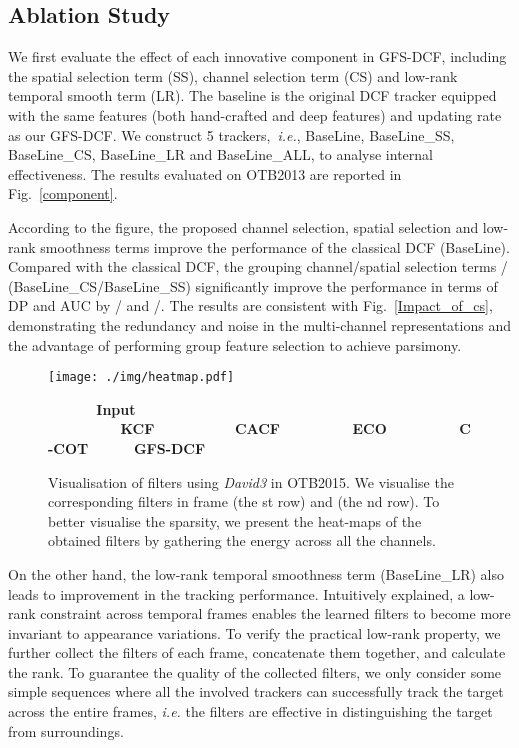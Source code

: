 \documentclass[10pt,twocolumn,letterpaper]{article}
\begin{document}
\subsection{Ablation Study}
We first evaluate the effect of each innovative component in GFS-DCF, including the spatial selection term  (SS), channel selection term   (CS) and low-rank temporal smooth term  (LR). 
The baseline is the original DCF tracker equipped with the same features (both hand-crafted and deep features) and updating rate as our GFS-DCF.
We construct 5 trackers,~\textit{i.e.}, BaseLine, BaseLine\_SS, BaseLine\_CS, BaseLine\_LR and BaseLine\_ALL, to analyse internal effectiveness.
The results evaluated on OTB2013 are reported in Fig.~\ref{component}.

According to the figure, the proposed channel selection, spatial selection and low-rank smoothness terms improve the performance of the classical DCF (BaseLine).
Compared with the classical DCF, the grouping channel/spatial selection terms / (BaseLine\_CS/BaseLine\_SS) significantly improve the performance in terms of DP and AUC by / and /.
The results are consistent with Fig.~\ref{Impact_of_cs}, demonstrating the redundancy and noise in the multi-channel representations and the advantage of performing group feature selection to achieve parsimony.
\begin{figure}[t]
\begin{center}
\texttt{[image: ./img/heatmap.pdf]}
\end{center}
\vspace{-0.4cm}
\footnotesize{\textbf{\ \ \ \ \ \ Input \ \ \ \ \ \ \ \ \ KCF\ \ \ \ \ \ \ \ \ \ CACF\ \ \ \ \ \ \ \ \  ECO\ \ \ \ \ \ \ \ \ C-COT \ \ \ \  \  GFS-DCF}}
\caption{Visualisation of filters using \textit{David3} in OTB2015. We visualise the corresponding filters in frame  (the st row) and  (the nd row). 
To better visualise the sparsity, we present the heat-maps of the obtained filters by gathering the energy across all the channels.}
\label{sparse}
\end{figure}
On the other hand, the low-rank temporal smoothness term  (BaseLine\_LR) also leads to improvement in the tracking performance.
Intuitively explained, a low-rank constraint across temporal frames enables the learned filters to become more invariant to appearance variations.
To verify the practical low-rank property, we further collect the filters of each frame, concatenate them together, and calculate the rank. 
To guarantee the quality of the collected filters, we only consider some simple sequences where all the involved trackers can successfully track the target across the entire frames, \textit{i.e.} the filters are effective in distinguishing the target from surroundings.
\end{document}
